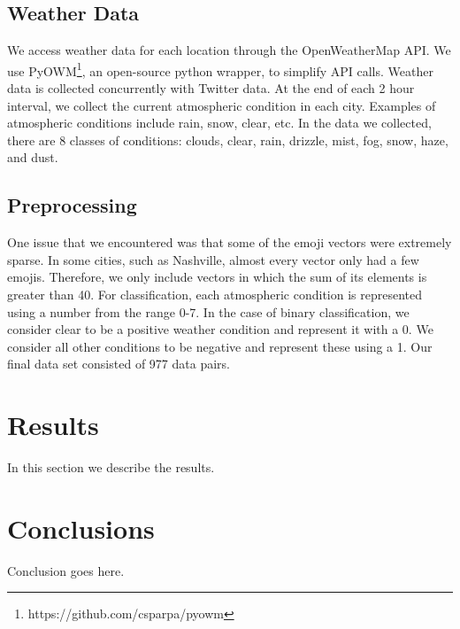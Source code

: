 \documentclass[12pt]{article}
\begin{document}
\subsection{Weather Data}
We access weather data for each location through the OpenWeatherMap API. We use PyOWM\footnote{https://github.com/csparpa/pyowm}, an open-source python wrapper, to simplify API calls. Weather data is collected concurrently with Twitter data. At the end of each 2 hour interval, we collect the current atmospheric condition in each city. Examples of atmospheric conditions include rain, snow, clear, etc. In the data we collected, there are 8 classes of conditions: clouds, clear, rain, drizzle, mist, fog, snow, haze, and dust.

\subsection{Preprocessing}
One issue that we encountered was that some of the emoji vectors were extremely sparse. In some cities, such as Nashville, almost every vector only had a few emojis. Therefore, we only include vectors in which the sum of its elements is greater than 40. For classification, each atmospheric condition is represented using a number from the range 0-7. In the case of binary classification, we consider clear to be a positive weather condition and represent it with a 0. We consider all other conditions to be negative and represent these using a 1. Our final data set consisted of 977 data pairs.

\section{Results}\label{results}
In this section we describe the results.

\section{Conclusions}\label{conclusions}
Conclusion goes here.

\newpage


\end{document}
